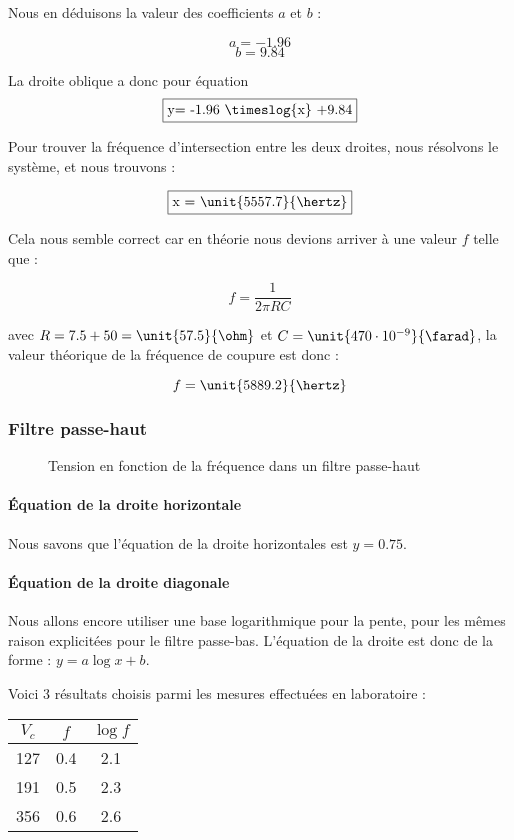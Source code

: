 Nous en déduisons la valeur des coefficients $a$ et $b$ :

$$a = -1.96$$
$$b= 9.84$$

La droite oblique a donc pour équation
$$\fbox{y= -1.96 \timeslog{x} +9.84}$$

Pour trouver la fréquence d'intersection entre les deux droites, nous résolvons le système, et nous trouvons :

$$\fbox{x = \unit{5557.7}{\hertz}}$$

Cela nous semble correct car en théorie nous devions arriver à une valeur $f$ telle que :

$$f=\frac{1}{2\pi RC}$$

avec $R= 7.5 + 50 = \unit{57.5}{\ohm}$ et $C= \unit{470 \cdot 10^{-9}}{\farad}$, la valeur théorique de la fréquence de coupure est donc :

$$f= \unit{5889.2}{\hertz}$$

\subsubsection{Filtre passe-haut}

\begin{figure}[h]
\centering

\caption{\label{premierebissectrice}Tension en fonction de la fréquence dans un filtre passe-haut}
\end{figure}

\paragraph{Équation de la droite horizontale}


Nous savons que l'équation de la droite horizontales est $y = 0.75$.

\paragraph{Équation de la droite diagonale}

Nous allons encore utiliser une base logarithmique pour la pente, pour les mêmes raison explicitées pour le filtre passe-bas.
L'équation de la droite est donc de la forme : $y=a \log{x}+b$.

Voici 3 résultats choisis parmi les mesures effectuées en laboratoire :

\begin{center}
\begin{tabular}{|c|c|c|}
\hline
$V_c$ & $f$ & $\log{f}$ \\
\hline
127 & 0.4 & 2.1\\
\hline
191 & 0.5 & 2.3\\
\hline
356 & 0.6 & 2.6 \\
\hline
\end{tabular}
\end{center}

